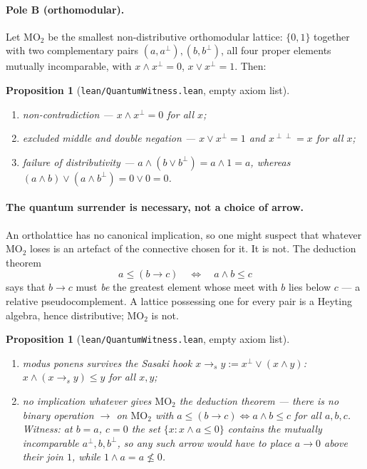\documentclass[11pt]{article}
\newtheorem{prop}[lem]{Proposition}
\theoremstyle{remark}
\begin{document}
\paragraph{Pole B (orthomodular).} Let $\mathrm{MO}_2$ be the smallest
non-distributive orthomodular lattice: $\{0, 1\}$ together with two
complementary pairs $(a, a^{\perp}), (b, b^{\perp})$, all four proper elements
mutually incomparable, with $x \wedge x^{\perp} = 0$, $x \vee x^{\perp} = 1$.
Then:

\begin{prop}[\texttt{lean/QuantumWitness.lean}, empty axiom list]\label{propB}
\leavevmode
\begin{enumerate}
\item[(i)] \emph{non-contradiction} --- $x \wedge x^{\perp} = 0$ for all $x$;
\item[(ii)] \emph{excluded middle and double negation} ---
$x \vee x^{\perp} = 1$ and $x^{\perp\perp} = x$ for all $x$;
\item[(iii)] \emph{failure of distributivity} ---
$a \wedge (b \vee b^{\perp}) = a \wedge 1 = a$, whereas
$(a\wedge b) \vee (a\wedge b^{\perp}) = 0 \vee 0 = 0$.
\end{enumerate}
\end{prop}

\paragraph{The quantum surrender is necessary, not a choice of arrow.}
An ortholattice has no canonical implication, so one might suspect that
whatever $\mathrm{MO}_2$ loses is an artefact of the connective chosen for
it. It is not. The deduction theorem
\[
  a \le (b \to c) \quad\Longleftrightarrow\quad a \wedge b \le c
\]
says that $b \to c$ must \emph{be} the greatest element whose meet with $b$
lies below $c$ --- a relative pseudocomplement. A lattice possessing one for
every pair is a Heyting algebra, hence distributive; $\mathrm{MO}_2$ is not.

\begin{prop}[\texttt{lean/QuantumWitness.lean}, empty axiom list]\label{propB2}
\leavevmode
\begin{enumerate}
\item[(i)] \emph{modus ponens survives} the Sasaki hook
$x \to_s y := x^{\perp} \vee (x \wedge y)$: \; $x \wedge (x \to_s y) \le y$
for all $x,y$;
\item[(ii)] \emph{no implication whatever gives $\mathrm{MO}_2$ the deduction
theorem} --- there is no binary operation $\to$ on $\mathrm{MO}_2$ with
$a \le (b \to c) \Leftrightarrow a \wedge b \le c$ for all $a,b,c$. Witness:
at $b = a$, $c = 0$ the set $\{x : x \wedge a \le 0\}$ contains the mutually
incomparable $a^{\perp}, b, b^{\perp}$, so any such arrow would have to place
$a \to 0$ above their join $1$, while $1 \wedge a = a \not\le 0$.
\end{enumerate}
\end{prop}
\end{document}
